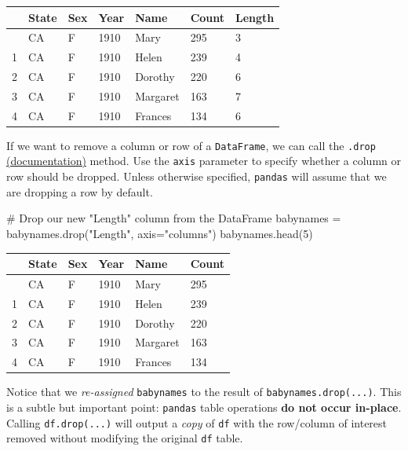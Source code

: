 \documentclass[
  letterpaper,
  DIV=11,
  numbers=noendperiod]{scrreprt}
\newenvironment{Shaded}{\begin{snugshade}}{\end{snugshade}}
\newcommand{\CommentTok}[1]{\textcolor[rgb]{0.37,0.37,0.37}{#1}}
\newcommand{\DecValTok}[1]{\textcolor[rgb]{0.68,0.00,0.00}{#1}}
\newcommand{\NormalTok}[1]{\textcolor[rgb]{0.00,0.23,0.31}{#1}}
\newcommand{\OperatorTok}[1]{\textcolor[rgb]{0.37,0.37,0.37}{#1}}
\newcommand{\StringTok}[1]{\textcolor[rgb]{0.13,0.47,0.30}{#1}}
\begin{document}
\begin{longtable}[]{@{}lllllll@{}}
\toprule\noalign{}
& State & Sex & Year & Name & Count & Length \\
\midrule\noalign{}
\endhead
\bottomrule\noalign{}
\endlastfoot
0 & CA & F & 1910 & Mary & 295 & 3 \\
1 & CA & F & 1910 & Helen & 239 & 4 \\
2 & CA & F & 1910 & Dorothy & 220 & 6 \\
3 & CA & F & 1910 & Margaret & 163 & 7 \\
4 & CA & F & 1910 & Frances & 134 & 6 \\
\end{longtable}

If we want to remove a column or row of a \texttt{DataFrame}, we can
call the \texttt{.drop}
\href{https://pandas.pydata.org/pandas-docs/stable/reference/api/pandas.DataFrame.drop.html}{(documentation)}
method. Use the \texttt{axis} parameter to specify whether a column or
row should be dropped. Unless otherwise specified, \texttt{pandas} will
assume that we are dropping a row by default.

\begin{Shaded}
\begin{Highlighting}[]
\CommentTok{\# Drop our new "Length" column from the DataFrame}
\NormalTok{babynames }\OperatorTok{=}\NormalTok{ babynames.drop(}\StringTok{"Length"}\NormalTok{, axis}\OperatorTok{=}\StringTok{"columns"}\NormalTok{)}
\NormalTok{babynames.head(}\DecValTok{5}\NormalTok{)}
\end{Highlighting}
\end{Shaded}

\begin{longtable}[]{@{}llllll@{}}
\toprule\noalign{}
& State & Sex & Year & Name & Count \\
\midrule\noalign{}
\endhead
\bottomrule\noalign{}
\endlastfoot
0 & CA & F & 1910 & Mary & 295 \\
1 & CA & F & 1910 & Helen & 239 \\
2 & CA & F & 1910 & Dorothy & 220 \\
3 & CA & F & 1910 & Margaret & 163 \\
4 & CA & F & 1910 & Frances & 134 \\
\end{longtable}

Notice that we \emph{re-assigned} \texttt{babynames} to the result of
\texttt{babynames.drop(...)}. This is a subtle but important point:
\texttt{pandas} table operations \textbf{do not occur in-place}. Calling
\texttt{df.drop(...)} will output a \emph{copy} of \texttt{df} with the
row/column of interest removed without modifying the original
\texttt{df} table.
\end{document}

